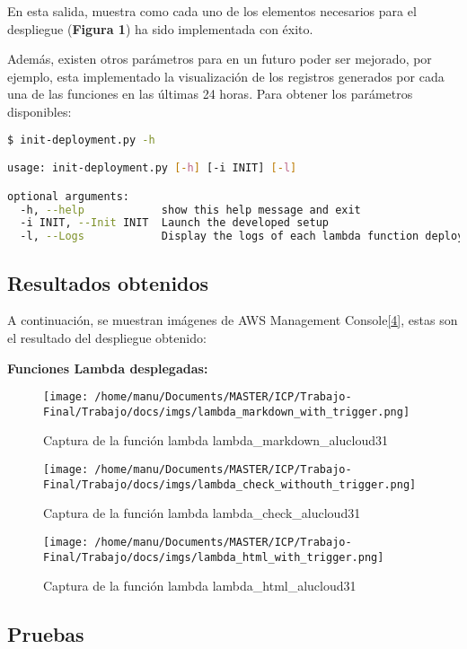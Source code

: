 \documentclass[
]{article}
\begin{document}
En esta salida, muestra como cada uno de los elementos necesarios para
el despliegue (\textbf{Figura 1}) ha sido implementada con éxito.

Además, existen otros parámetros para en un futuro poder ser mejorado,
por ejemplo, esta implementado la visualización de los registros
generados por cada una de las funciones en las últimas 24 horas. Para
obtener los parámetros disponibles:

\begin{lstlisting}[language=bash,caption={script help params}]
$ init-deployment.py -h

usage: init-deployment.py [-h] [-i INIT] [-l]

optional arguments:
  -h, --help            show this help message and exit
  -i INIT, --Init INIT  Launch the developed setup
  -l, --Logs            Display the logs of each lambda function deployed.
\end{lstlisting}

\hypertarget{header-n172}{%
\subsection{Resultados obtenidos}\label{header-n172}}

A continuación, se muestran imágenes de AWS Management
Console\protect\hyperlink{1}{{[}4{]}}, estas son el resultado del
despliegue obtenido:

\textbf{Funciones Lambda desplegadas:}

\begin{figure}[H]
\centering
\texttt{[image: /home/manu/Documents/MASTER/ICP/Trabajo-Final/Trabajo/docs/imgs/lambda\_markdown\_with\_trigger.png]}
\caption{Captura de la función lambda lambda\_markdown\_alucloud31}
\end{figure}

\begin{figure}[H]
\centering
\texttt{[image: /home/manu/Documents/MASTER/ICP/Trabajo-Final/Trabajo/docs/imgs/lambda\_check\_withouth\_trigger.png]}
\caption{Captura de la función lambda lambda\_check\_alucloud31}
\end{figure}

\begin{figure}[H]
\centering
\texttt{[image: /home/manu/Documents/MASTER/ICP/Trabajo-Final/Trabajo/docs/imgs/lambda\_html\_with\_trigger.png]}
\caption{Captura de la función lambda lambda\_html\_alucloud31}
\end{figure}

\hypertarget{header-n178}{%
\subsection{Pruebas}\label{header-n178}}
\end{document}
